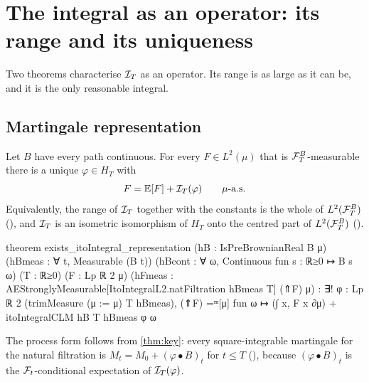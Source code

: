 \documentclass[11pt]{article}
\newcommand{\HT}{H_T}
\newcommand{\bulletB}{\mathbin{\bullet}}
\begin{document}
\section{The integral as an operator: its range and its uniqueness}\label{sec:operator}

Two theorems characterise $\mathcal{I}_T$ as an operator. Its range is as large as it can be, and it is the only
reasonable integral.

\subsection{Martingale representation}\label{sec:representation}

\begin{theorem}\label{thm:mrt}
Let $B$ have every path continuous. For every $F\in L^2(\mu)$ that is $\mathcal{F}^B_T$-measurable there is a unique
$\varphi\in\HT$ with
\[
  F=\mathbb{E}[F]+\mathcal{I}_T(\varphi)\qquad\mu\text{-a.s.}
\]
Equivalently, the range of $\mathcal{I}_T$ together with the constants is the whole of $L^2(\mathcal{F}^B_T)$
(), and $\mathcal{I}_T$ is an isometric isomorphism of $\HT$ onto the
centred part of $L^2(\mathcal{F}^B_T)$ ().
\end{theorem}

\begin{leancode}[caption={Martingale representation, terminal form (\texttt{Foundations/MartingaleRepresentation}).},label=lst:mrt]
theorem exists_itoIntegral_representation (hB : IsPreBrownianReal B μ)
    (hBmeas : ∀ t, Measurable (B t))
    (hBcont : ∀ ω, Continuous fun s : ℝ≥0 ↦ B s ω) (T : ℝ≥0)
    (F : Lp ℝ 2 μ)
    (hFmeas : AEStronglyMeasurable[ItoIntegralL2.natFiltration hBmeas T] (⇑F) μ) :
    ∃! φ : Lp ℝ 2 (trimMeasure (μ := μ) T hBmeas),
      (⇑F) =ᵐ[μ] fun ω ↦ (∫ x, F x ∂μ) + itoIntegralCLM hB T hBmeas φ ω
\end{leancode}

The process form follows from \cref{thm:key}: every square-integrable martingale for the natural filtration is
$M_t=M_0+(\varphi\bulletB B)_t$ for $t\le T$ (), because $(\varphi\bulletB B)_t$ is the
$\mathcal{F}_t$-conditional expectation of $\mathcal{I}_T(\varphi)$.
\end{document}
